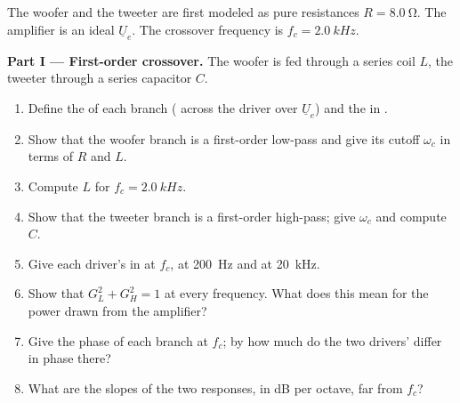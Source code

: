 \begin{problem}
\label{pb:b1:filters-transfer-functions:1}
The woofer and the tweeter are first modeled as pure resistances
$R = \qty{8.0}{\ohm}$. The amplifier is an ideal 
$\underline U_e$. The crossover frequency is $f_c = \qty{2.0}{kHz}$.

\medskip
\noindent\textbf{Part I --- First-order crossover.}
The woofer is fed through a series coil $L$, the tweeter through a
series capacitor $C$.
\begin{enumerate}
  \item Define the  of each branch ( across the
        driver over $\underline U_e$) and the  in .
  \item Show that the woofer branch is a first-order low-pass and give
        its cutoff $\omega_c$ in terms of $R$ and $L$.
  \item Compute $L$ for $f_c = \qty{2.0}{kHz}$.
  \item Show that the tweeter branch is a first-order high-pass; give
        $\omega_c$ and compute $C$.
  \item Give each driver's  in  at $f_c$, at \qty{200}{Hz}
        and at \qty{20}{kHz}.
  \item Show that $G_L^2 + G_H^2 = 1$ at every frequency. What does
        this mean for the power drawn from the amplifier?
  \item Give the phase of each branch at $f_c$; by how much do the two
        drivers'  differ in phase there?
  \item What are the slopes of the two responses, in dB per octave, far
        from $f_c$?
\end{enumerate}


\end{problem}
